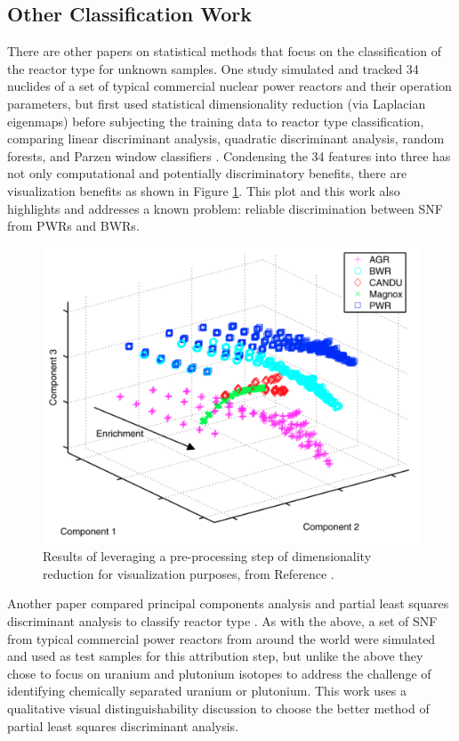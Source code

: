 \subsection{Other Classification Work}

There are other papers on statistical methods that focus on the classification
of the reactor type for unknown samples.  One study simulated and tracked 34
nuclides of a set of typical commercial nuclear power reactors and their
operation parameters, but first used statistical dimensionality reduction (via
Laplacian eigenmaps) before subjecting the training data to reactor type
classification, comparing linear discriminant analysis, quadratic discriminant
analysis, random forests, and Parzen window classifiers \cite{jones_snf_2014,
jones_viz_2014}.  Condensing the 34 features into three has not only
computational and potentially discriminatory benefits, there are visualization
benefits as shown in Figure \ref{fig:jones}.  This plot and this work also
highlights and addresses a known problem: reliable discrimination between
\gls{SNF} from \glspl{PWR} and \glspl{BWR}. 

\begin{figure}[!htb]
  \centering
  \includegraphics[width=0.7\linewidth]{./chapters/litrev/jones.png}
  \caption[Example of dimensionality reduction for visualization]
          {Results of leveraging a pre-processing step of dimensionality 
           reduction for visualization purposes, from Reference 
           \cite{jones_snf_2014}.}
  \label{fig:jones}
\end{figure}

Another paper compared principal components analysis and partial least squares
discriminant analysis to classify reactor type \cite{pu_discrimination}. As
with the above, a set of \gls{SNF} from typical commercial power reactors from
around the world were simulated and used as test samples for this attribution
step, but unlike the above they chose to focus on uranium and plutonium
isotopes to address the challenge of identifying chemically separated uranium
or plutonium. This work uses a qualitative visual distinguishability discussion
to choose the better method of partial least squares discriminant analysis.

